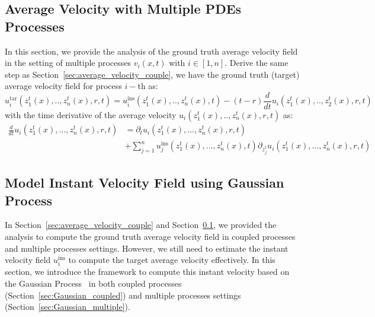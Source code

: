 \documentclass{article}
\begin{document}
\subsection{Average Velocity with Multiple PDEs Processes}
\label{sec:avergae_velocity_multiple}
In this section, we provide the analysis of the ground truth average velocity field in the setting of multiple processes $v_i(x,t)$ with $i \in [1, n]$. Derive the same step as Section~\ref{sec:average_velocity_couple}, we have the ground truth (target) average velocity field for process $i-$th as: 
\begin{equation}
     u_i^{\text{tar}}(z^t_1(x),.., z^t_n(x), r, t) = u^{\text{ins}}_i(z^t_1(x),.., z^t_n(x), t ) - (t -r) \frac{d}{dt}  u_i(z^t_1(x),.., z^t_2(x), r, t) \label{eq:target_def_average_multiple_velocity}
\end{equation}
with the time derivative of the average velocity $u_i(z^t_1(x),.., z^t_n(x), r, t)$ as:
\begin{align}
    \frac{d}{dt}  u_i(z^t_1(x),..., z^t_n(x), r, t) &=\partial_t u_i(z^t_1(x), ...,z^t_n(x), r, t) \label{eq:time_der_multiple} \\ \nonumber
    &+ \sum_{j=1}^{n} u^{\text{ins}}_j( z^t_1(x), ...,z^t_n(x), t ) \partial_{z_j^t} u_i (z^t_1(x),..., z^t_n(x), r, t) 
\end{align}

\subsection{Model Instant Velocity Field using Gaussian Process}
In Section~\ref{sec:average_velocity_couple} and Section~\ref{sec:avergae_velocity_multiple}, we provided the analysis to compute the ground truth average velocity field in coupled processes and multiple processes settings. However, we still need to estimate the instant velocity field $u^{\text{ins}}_i$ to compute the target average velocity effectively. In this section, we introduce the framework to compute this instant velocity based on the Gaussian Process~\cite{Rasmussen2006Gaussian} in both coupled processes (Section~\ref{sec:Gaussian_coupled}) and multiple processes settings (Section~\ref{sec:Gaussian_multiple}).
\end{document}
